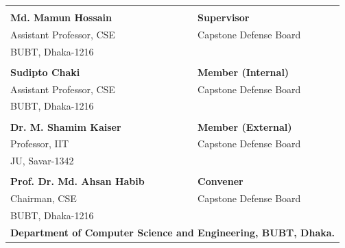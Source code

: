 \begin{table}[!h]
\centering
\renewcommand{\arraystretch}{1.7}

\begin{tabular*}{\textwidth}{@{\extracolsep{\fill}} p{} >{\raggedleft\arraybackslash}p{}}

\underline{\hspace{6cm}} &
\\[-0.1cm]
\textbf{Md. Mamun Hossain} &
\textbf{Supervisor} \\
Assistant Professor, CSE &
Capstone Defense Board \\
BUBT, Dhaka-1216 &
\\[0.8cm]

\underline{\hspace{6cm}} &
\\[-0.1cm]
\textbf{Sudipto Chaki} &
\textbf{Member (Internal)} \\
Assistant Professor, CSE &
Capstone Defense Board \\
BUBT, Dhaka-1216 &
\\[0.8cm]

\underline{\hspace{6cm}} &
\\[-0.1cm]
\textbf{Dr. M. Shamim Kaiser} &
\textbf{Member (External)} \\
Professor, IIT &
Capstone Defense Board \\
JU, Savar-1342 &
\\[0.8cm]

\underline{\hspace{6cm}} &
\\[-0.1cm]
\textbf{Prof. Dr. Md. Ahsan Habib} &
\textbf{Convener} \\
Chairman, CSE &
Capstone Defense Board \\
BUBT, Dhaka-1216 &
\\[1cm]

\multicolumn{2}{c}{\textbf{Department of Computer Science and Engineering, BUBT, Dhaka.}}\\
\end{tabular*}
\end{table}

